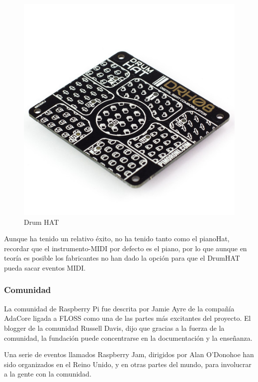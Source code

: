 \documentclass[a4paper,11pt,oneside]{book}
\begin{document}
\begin{figure}[H]
\begin{center}
\includegraphics[scale=0.5]{Imagenes/Drum_HAT.jpg}
\caption{Drum HAT}
\label{Drum HAT}
\end{center}
\end{figure}

Aunque ha tenido un relativo éxito, no ha tenido tanto como el pianoHat, recordar que el instrumento-MIDI por defecto es el piano, por lo que aunque en teoría es posible los fabricantes no han dado la opción para que el DrumHAT pueda sacar eventos MIDI.

\subsubsection{Comunidad}

La comunidad de Raspberry Pi fue descrita por Jamie Ayre de la compañía AdaCore ligada a FLOSS como una de las partes más excitantes del proyecto. El blogger de la comunidad Russell Davis, dijo que gracias a la fuerza de la comunidad, la fundación puede concentrarse en la documentación y la enseñanza.

Una serie de eventos llamados Raspberry Jam, dirigidos por Alan O’Donohoe han sido organizados en el Reino Unido, y en otras partes del mundo, para involucrar a la gente con la comunidad.
\end{document}
